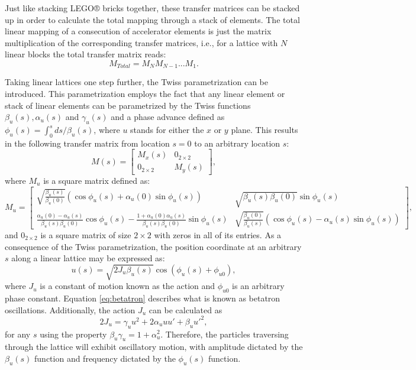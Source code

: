 Just like stacking LEGO® bricks together, these transfer matrices can be stacked up in order to calculate the total mapping through a stack of elements. The total linear mapping of a consecution of accelerator elements is just the matrix multiplication of the corresponding transfer matrices, i.e., for a lattice with $N$ linear blocks the total transfer matrix reads:
\begin{equation}
    \label{eq:consecution}
    M_{Total}=M_NM_{N-1}...M_1.     
\end{equation}

Taking linear lattices one step further, the Twiss parametrization can be introduced. This parametrization employs the fact that any linear element or stack of linear elements can be parametrized by the Twiss functions $\beta_u(s),\alpha_u(s)$ and $\gamma_u(s)$ and a phase advance defined as $  \phi_u(s)=\int_0^s ds/\beta_u(s)$, where $u$ stands for either the $x$ or $y$ plane. This results in the following transfer matrix from location $s=0$ to an arbitrary location $s$:
\begin{equation}
    \label{eq:twissmatrix}
    M(s)= 
    \begin{bmatrix} 
    M_x(s) & 0_{2 \times 2} \\ 
    0_{2 \times 2} & M_y(s)
    \end{bmatrix},
\end{equation}
where $M_u$ is a square matrix defined as:
\begin{equation}
    \label{eq:mu}
    M_u= 
    \begin{bmatrix} 
    \sqrt{\frac{\beta_u(s)}{\beta_u (0)}}\left( \cos  \phi_u(s) +\alpha_u(0) \sin  \phi_u(s) \right) & \sqrt{\beta_u(s) \beta_u(0)} \sin  \phi_u(s) \\ \frac{\alpha_u(0)-\alpha_u(s)}{\beta_u(s) \beta_u(0)}\cos  \phi_u(s) - \frac{1+\alpha_u(0)\alpha_u(s)}{\beta_u(s) \beta_u(0)} \sin  \phi_u(s) & \sqrt{\frac{\beta_u(0)}{\beta_u (s)}}\left( \cos  \phi_u(s) - \alpha_u(s) \sin  \phi_u(s) \right) 
    \end{bmatrix},
\end{equation}
and $0_{2\times 2}$ is a square matrix of size $2\times 2$ with zeros in all of its entries. As a consequence of the Twiss parametrization, the position coordinate at an arbitrary $s$ along a linear lattice may be expressed as:
\begin{equation}
    \label{eq:betatron}
    u(s)=\sqrt{2 J_u \beta_u(s)} \cos \left(  \phi_u(s) + \phi_{u0} \right),
\end{equation} 
where $J_u$ is a constant of motion known as the action and $\phi_{u0}$ is an arbitrary phase constant. Equation \ref{eq:betatron} describes what is known as betatron oscillations. Additionally, the action $J_u$ can be calculated as 
\begin{equation}
    \label{eq:ellipse}
    2J_u=\gamma_u u^2 +2\alpha_u u u' +\beta_u u'^2, 
\end{equation}
for any $s$ using the property $\beta_u \gamma_u = 1+\alpha_u^2$. Therefore, the particles traversing through the lattice will exhibit oscillatory motion, with amplitude dictated by the $\beta_u(s)$ function and frequency dictated by the $ \phi_u(s)$ function.


